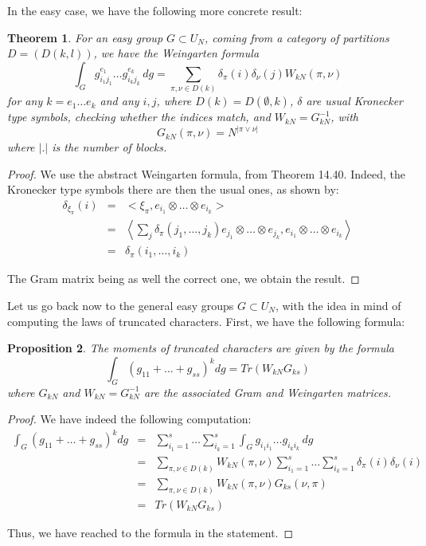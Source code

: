 \documentclass[12pt]{amsbook}
\newtheorem{theorem}{Theorem}[chapter]
\newtheorem{proposition}[theorem]{Proposition}
\begin{document}
In the easy case, we have the following more concrete result:


\begin{theorem}
For an easy group $G\subset U_N$, coming from a category of partitions $D=(D(k,l))$, we have the Weingarten formula
$$\int_Gg_{i_1j_1}^{e_1}\ldots g_{i_kj_k}^{e_k}\,dg=\sum_{\pi,\nu\in D(k)}\delta_\pi(i)\delta_\nu(j)W_{kN}(\pi,\nu)$$
for any $k=e_1\ldots e_k$ and any $i,j$, where $D(k)=D(\emptyset,k)$, $\delta$ are usual Kronecker type symbols, checking whether the indices match, and $W_{kN}=G_{kN}^{-1}$, with 
$$G_{kN}(\pi,\nu)=N^{|\pi\vee\nu|}$$
where $|.|$ is the number of blocks. 
\end{theorem}

\begin{proof}
We use the abstract Weingarten formula, from Theorem 14.40. Indeed, the Kronecker type symbols there are then the usual ones, as shown by:
\begin{eqnarray*}
\delta_{\xi_\pi}(i)
&=&<\xi_\pi,e_{i_1}\otimes\ldots\otimes e_{i_k}>\\
&=&\left<\sum_j\delta_\pi(j_1,\ldots,j_k)e_{j_1}\otimes\ldots\otimes e_{j_k},e_{i_1}\otimes\ldots\otimes e_{i_k}\right>\\
&=&\delta_\pi(i_1,\ldots,i_k)
\end{eqnarray*}

The Gram matrix being as well the correct one, we obtain the result.
\end{proof}

Let us go back now to the general easy groups $G\subset U_N$, with the idea in mind of computing the laws of truncated characters. First, we have the following formula:


\begin{proposition}
The moments of truncated characters are given by the formula
$$\int_G(g_{11}+\ldots +g_{ss})^kdg=Tr(W_{kN}G_{ks})$$
where $G_{kN}$ and $W_{kN}=G_{kN}^{-1}$ are the associated Gram and Weingarten matrices.
\end{proposition}

\begin{proof}
We have indeed the following computation:
\begin{eqnarray*}
\int_G(g_{11}+\ldots +g_{ss})^kdg
&=&\sum_{i_1=1}^{s}\ldots\sum_{i_k=1}^s\int_Gg_{i_1i_1}\ldots g_{i_ki_k}\,dg\\
&=&\sum_{\pi,\nu\in D(k)}W_{kN}(\pi,\nu)\sum_{i_1=1}^{s}\ldots\sum_{i_k=1}^s\delta_\pi(i)\delta_\nu(i)\\
&=&\sum_{\pi,\nu\in D(k)}W_{kN}(\pi,\nu)G_{ks}(\nu,\pi)\\
&=&Tr(W_{kN}G_{ks})
\end{eqnarray*}

Thus, we have reached to the formula in the statement.
\end{proof}
\end{document}
